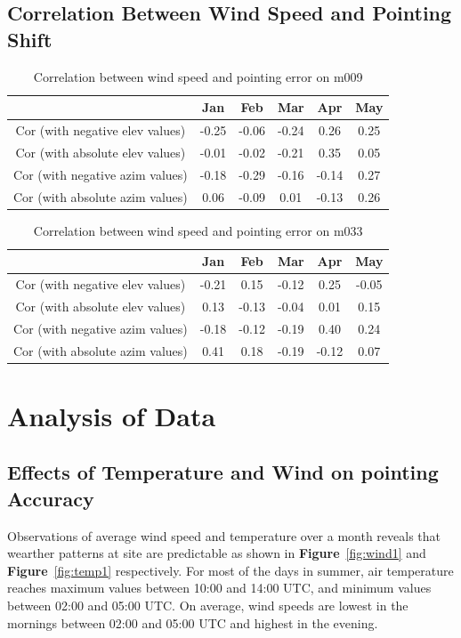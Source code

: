\documentclass{article}
\begin{document}
\subsection{Correlation Between Wind Speed and Pointing Shift }

\begin{table}[H]
	\caption{Correlation between wind speed and pointing error on m009}
	\label{tab:table3}
	\centering	
	\begin{tabular}[b]{|c|c|c|c|c|c|}
		\hline
		&\textbf{Jan}	& \textbf{Feb}& \textbf{Mar}&\textbf{Apr}&\textbf{May}\\
		\hline
		Cor (with negative elev values) &-0.25&-0.06&-0.24&0.26&0.25\\
		\hline
		Cor (with absolute elev values) &-0.01&-0.02&-0.21&0.35&0.05\\
		\hline
		Cor (with negative azim values) &-0.18&-0.29&-0.16&-0.14&0.27\\	
		\hline
		Cor (with absolute azim values) &0.06&-0.09&0.01&-0.13&0.26\\	
		\hline
	\end{tabular}	
\end{table}

\begin{table}[H]
	\caption{Correlation between wind speed and pointing error on m033}
	\label{tab:table4}
	\centering	
	\begin{tabular}[b]{|c|c|c|c|c|c|}
		\hline
		&\textbf{Jan}	& \textbf{Feb}& \textbf{Mar}&\textbf{Apr}&\textbf{May}\\
		\hline
		Cor (with negative elev values) &-0.21&0.15&-0.12&0.25&-0.05\\
		\hline
		Cor (with absolute elev values) &0.13&-0.13&-0.04&0.01&0.15\\
		\hline
		Cor (with negative azim values) &-0.18&-0.12&-0.19&0.40&0.24\\	
		\hline
		Cor (with absolute azim values) &0.41&0.18&-0.19&-0.12&0.07\\
		\hline
	\end{tabular}
\end{table}
\section{Analysis of Data}

\subsection{Effects of Temperature and Wind on pointing Accuracy}
Observations of average wind speed and temperature over a month reveals that wearther patterns at site are predictable as shown in \textbf{Figure}~\ref{fig:wind1} and \textbf{Figure}~\ref{fig:temp1} respectively.  For most of the days in summer, air temperature reaches maximum values between 10:00 and 14:00 UTC, and minimum values between 02:00 and 05:00 UTC.  On average, wind speeds are lowest in the mornings between 02:00 and 05:00 UTC and highest in the evening.\\
\end{document}
